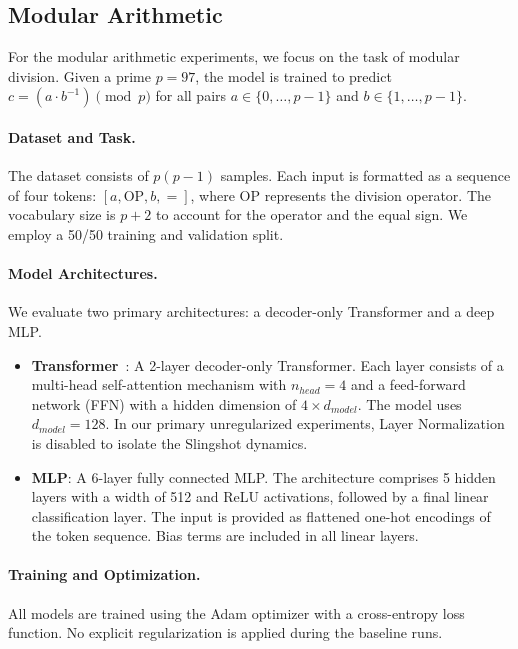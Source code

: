\documentclass{article}
\theoremstyle{plain}
\theoremstyle{definition}
\theoremstyle{remark}
\begin{document}
\subsection{Modular Arithmetic}
For the modular arithmetic experiments, we focus on the task of modular division. 
Given a prime $p=97$, the model is trained to predict $c = (a \cdot b^{-1}) \pmod p$ for 
all pairs $a \in \{0, \dots, p-1\}$ and $b \in \{1, \dots, p-1\}$.

\paragraph{Dataset and Task.}
The dataset consists of $p(p-1)$ samples. 
Each input is formatted as a sequence of four tokens: $[a, \text{OP}, b, =]$, 
where OP represents the division operator. 
The vocabulary size is $p+2$ to account for the operator and the equal sign. 
We employ a 50/50 training and validation split.

\paragraph{Model Architectures.}
We evaluate two primary architectures: a decoder-only Transformer and a deep MLP.

\begin{itemize}
\item \textbf{Transformer}~\cite{vaswani2017}: A 2-layer decoder-only Transformer. Each layer consists of a multi-head self-attention mechanism with $n_{head}=4$ and a feed-forward network (FFN) with a hidden dimension of $4 \times d_{model}$. The model uses $d_{model}=128$. In our primary unregularized experiments, Layer Normalization is disabled to isolate the Slingshot dynamics.
\item \textbf{MLP}: A 6-layer fully connected MLP. The architecture comprises 5 hidden layers with a width of 512 and ReLU activations, followed by a final linear classification layer. The input is provided as flattened one-hot encodings of the token sequence. Bias terms are included in all linear layers.
\end{itemize}

\paragraph{Training and Optimization.}
All models are trained using the Adam optimizer with a cross-entropy loss function. 
No explicit regularization is applied during the baseline runs.
\end{document}
